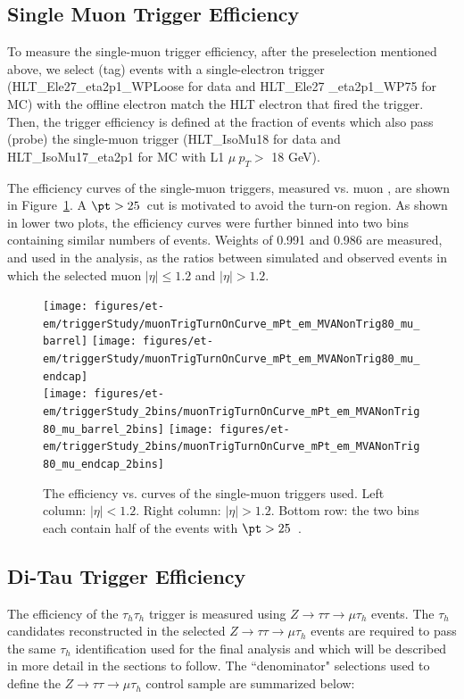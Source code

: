 \subsection{Single Muon Trigger Efficiency}\label{sec:muTrigger}
To measure the single-muon trigger efficiency, after the preselection
mentioned above, we select (tag) events with a single-electron trigger
 (HLT\_Ele27\_eta2p1\_WPLoose for data and HLT\_Ele27 \_eta2p1\_WP75 for MC) 
with the offline electron match the HLT electron that fired the trigger.
Then, the trigger efficiency is defined at the fraction of events
which also pass (probe) the single-muon trigger 
(HLT\_IsoMu18 for data and HLT\_IsoMu17\_eta2p1 for MC with L1 $\mu~p_T > $ 18 GeV).

The efficiency curves of the single-muon triggers, measured vs. muon
\pt, are shown in Figure~\ref{fig:muturnon}. A $\pt>25$~\gev cut is
motivated to avoid the turn-on region. As shown in lower two plots,
the efficiency curves were further binned into two bins containing
similar numbers of events.  Weights of 0.991 and 0.986 are measured,
and used in the analysis, as the ratios between simulated and observed
events in which the selected muon $|\eta| \leq 1.2$ and $|\eta|>1.2$.
\begin{figure}\centering
  \texttt{[image: figures/et-em/triggerStudy/muonTrigTurnOnCurve\_mPt\_em\_MVANonTrig80\_mu\_barrel]}
  \texttt{[image: figures/et-em/triggerStudy/muonTrigTurnOnCurve\_mPt\_em\_MVANonTrig80\_mu\_endcap]} \\
  \texttt{[image: figures/et-em/triggerStudy\_2bins/muonTrigTurnOnCurve\_mPt\_em\_MVANonTrig80\_mu\_barrel\_2bins]}
  \texttt{[image: figures/et-em/triggerStudy\_2bins/muonTrigTurnOnCurve\_mPt\_em\_MVANonTrig80\_mu\_endcap\_2bins]} \\
  \caption{\label{fig:muturnon} The efficiency vs. \pt curves of the
    single-muon triggers used.  Left column: $|\eta|<1.2$.  Right
    column: $|\eta|>1.2$.  Bottom row: the two bins each contain half
    of the events with $\pt>25$~\gev.}
\end{figure}

\subsection{Di-Tau Trigger Efficiency}\label{sec:tauTrigger}

The efficiency of the $\tau_{h}\tau_{h}$ trigger is measured using 
$Z\to\tau\tau\to\mu\tau_{h}$ events.  The $\tau_{h}$ candidates 
reconstructed in the selected $Z\to\tau\tau\to\mu\tau_{h}$ events are 
required to pass the same $\tau_{h}$ identification used for the final
analysis and which will be described in more detail in the sections to follow. The 
``denominator" selections used to define the $Z\to\tau\tau\to\mu\tau_{h}$ control sample 
are summarized below:

